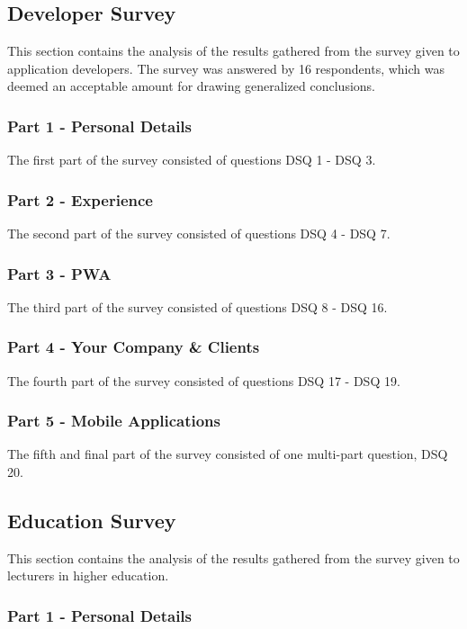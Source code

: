 \documentclass[a4paper,12pt]{article}
\begin{document}
\subsection{Developer Survey}
This section contains the analysis of the results gathered from the survey given to application developers. The survey was answered by 16 respondents, which was deemed an acceptable amount for drawing generalized conclusions. 

\subsubsection{Part 1 - Personal Details}
The first part of the survey consisted of questions DSQ 1 - DSQ 3. 



\subsubsection{Part 2 - Experience}
The second part of the survey consisted of questions DSQ 4 - DSQ 7. 




\subsubsection{Part 3 - PWA}
The third part of the survey consisted of questions DSQ 8 - DSQ 16. 

\subsubsection{Part 4 - Your Company \& Clients}
The fourth part of the survey consisted of questions DSQ 17 - DSQ 19. 

\subsubsection{Part 5 - Mobile Applications}
The fifth and final part of the survey consisted of one multi-part question, DSQ 20.





\subsection{Education Survey}
This section contains the analysis of the results gathered from the survey given to lecturers in higher education.

\subsubsection{Part 1 - Personal Details}
\end{document}
